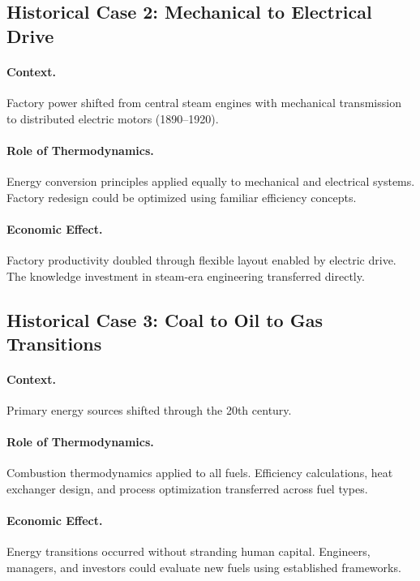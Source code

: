 \subsection{Historical Case 2: Mechanical to Electrical Drive}

\paragraph{Context.} Factory power shifted from central steam engines with
mechanical transmission to distributed electric motors (1890--1920).

\paragraph{Role of Thermodynamics.} Energy conversion principles applied
equally to mechanical and electrical systems. Factory redesign could be
optimized using familiar efficiency concepts.

\paragraph{Economic Effect.} Factory productivity doubled through flexible
layout enabled by electric drive. The knowledge investment in steam-era
engineering transferred directly.

\subsection{Historical Case 3: Coal to Oil to Gas Transitions}

\paragraph{Context.} Primary energy sources shifted through the 20th century.

\paragraph{Role of Thermodynamics.} Combustion thermodynamics applied to all
fuels. Efficiency calculations, heat exchanger design, and process
optimization transferred across fuel types.

\paragraph{Economic Effect.} Energy transitions occurred without stranding
human capital. Engineers, managers, and investors could evaluate new fuels
using established frameworks.

